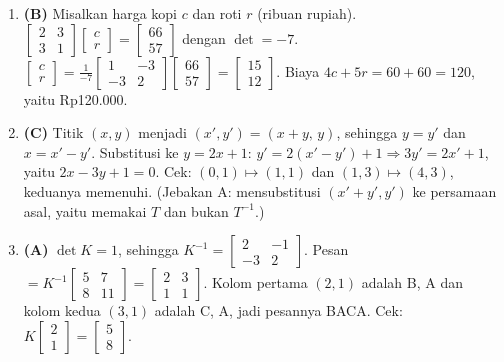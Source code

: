\documentclass[a4paper,11pt]{article}
\begin{document}
\begin{enumerate}[leftmargin=2em,itemsep=2pt,topsep=2pt]
\item[\textbf{7.}] \textbf{(B)} Misalkan harga kopi $c$ dan roti $r$ (ribuan rupiah). $\begin{bmatrix}2&3\\3&1\end{bmatrix}\begin{bmatrix}c\\r\end{bmatrix}=\begin{bmatrix}66\\57\end{bmatrix}$ dengan $\det=-7$. $\begin{bmatrix}c\\r\end{bmatrix}=\frac{1}{-7}\begin{bmatrix}1&-3\\-3&2\end{bmatrix}\begin{bmatrix}66\\57\end{bmatrix}=\begin{bmatrix}15\\12\end{bmatrix}$. Biaya $4c+5r=60+60=120$, yaitu Rp120.000.
\item[\textbf{8.}] \textbf{(C)} Titik $(x,y)$ menjadi $(x',y')=(x+y,\,y)$, sehingga $y=y'$ dan $x=x'-y'$. Substitusi ke $y=2x+1$: $y'=2(x'-y')+1\Rightarrow3y'=2x'+1$, yaitu $2x-3y+1=0$. Cek: $(0,1)\mapsto(1,1)$ dan $(1,3)\mapsto(4,3)$, keduanya memenuhi. (Jebakan A: mensubstitusi $(x'+y',y')$ ke persamaan asal, yaitu memakai $T$ dan bukan $T^{-1}$.)
\item[\textbf{9.}] \textbf{(A)} $\det K=1$, sehingga $K^{-1}=\begin{bmatrix}2&-1\\-3&2\end{bmatrix}$. Pesan $=K^{-1}\begin{bmatrix}5&7\\8&11\end{bmatrix}=\begin{bmatrix}2&3\\1&1\end{bmatrix}$. Kolom pertama $(2,1)$ adalah B, A dan kolom kedua $(3,1)$ adalah C, A, jadi pesannya BACA. Cek: $K\begin{bmatrix}2\\1\end{bmatrix}=\begin{bmatrix}5\\8\end{bmatrix}$.

\end{enumerate}
\end{document}
